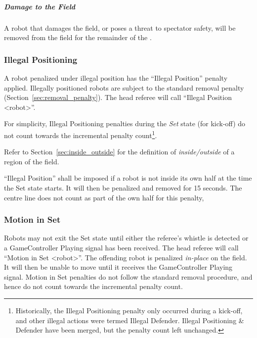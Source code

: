 \subparagraph{Damage to the Field}
\label{sec:damage}

A robot that damages the field, or poses a threat to spectator safety, will be removed from the field for the remainder of the .


\subsubsection{Illegal Positioning}
\label{sec:illegal_positioning}

A robot penalized under illegal position has the ``Illegal Position'' penalty applied. Illegally positioned robots are subject to the standard removal penalty (\cf Section~\ref{sec:removal_penalty}).
The head referee will call ``Illegal Position  \textless robot\textgreater''.

For simplicity, Illegal Positioning penalties during the \textit{Set} state (for kick-off) do not count towards the incremental penalty count\footnote{Historically, the Illegal Positioning penalty only occurred during a kick-off, and other illegal actions were termed Illegal Defender. Illegal Positioning \& Defender have been merged, but the penalty count left unchanged.}.

Refer to Section~\ref{sec:inside_outside} for the definition of \textit{inside/outside} of a region of the field.

``Illegal Position'' shall be imposed if a robot is not inside its own half at the time the Set state starts. It will then be penalized and removed for 15 seconds. The centre line does not count as part of the own half for this penalty, 

\subsubsection{Motion in Set}
\label{sec:motion_in_set}

Robots may not exit the Set state until either the referee's whistle is detected or a GameController Playing signal has been received.
The head referee will call ``Motion in Set \textless robot\textgreater''.
The offending robot is penalized \textit{in-place} on the field. It will then be unable to move until it receives the GameController Playing signal. Motion in Set penalties do not follow the standard removal procedure, and hence do not count towards the incremental penalty count.

